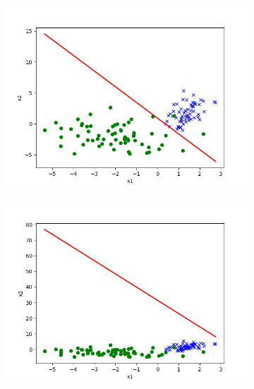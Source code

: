 \begin{answer}
\begin{figure}[h]
    \begin{subfigure}[b]{0.5\linewidth}
        \centering
        \includegraphics[width=\linewidth]{tex/p02c_pred.txt.png}
    \end{subfigure}
    \begin{subfigure}[b]{0.5\linewidth}
        \centering
        \includegraphics[width=\linewidth]{tex/p02d_pred.txt.png}
    \end{subfigure}
    \begin{subfigure}[b]{0.5\linewidth}
        \centering

\end{subfigure}
\end{figure}
\end{answer}
